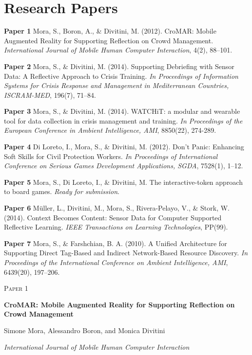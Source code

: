 \chapter{Research Papers}\label{papers}

\textbf{Paper 1} Mora, S., Boron, A., \& Divitini, M. (2012). CroMAR:
Mobile Augmented Reality for Supporting Reflection on Crowd Management.
\emph{International Journal of Mobile Human Computer Interaction}, 4(2),
88--101. 

\textbf{Paper 2} Mora, S., \& Divitini, M. (2014). Supporting Debriefing
with Sensor Data: A Reflective Approach to Crisis Training. \emph{In
Proceedings of Information Systems for Crisis Response and Management in
Mediterranean Countries, ISCRAM-MED}, 196(7), 71--84. 

\textbf{Paper 3} Mora, S., \& Divitini, M. (2014). WATCHiT: a modular
and wearable tool for data collection in crisis management and training.
\emph{In Proceedings of the European Conference in Ambient Intelligence,
AMI}, 8850(22), 274-289. 

\textbf{Paper 4} Di Loreto, I., Mora, S., \& Divitini, M. (2012). Don't
Panic: Enhancing Soft Skills for Civil Protection Workers. \emph{In
Proceedings of International Conference on Serious Games Development
Applications, SGDA}, 7528(1), 1--12. 

\textbf{Paper 5} Mora, S., Di Loreto, I., \& Divitini, M. The
interactive-token approach to board games. \emph{Ready for submission}.

\textbf{Paper 6} Müller, L., Divitini, M., Mora, S., Rivera-Pelayo, V.,
\& Stork, W. (2014). Context Becomes Content: Sensor Data for Computer
Supported Reflective Learning. \emph{IEEE Transactions on Learning
Technologies}, PP(99). 

\textbf{Paper 7} Mora, S., \& Farshchian, B. A. (2010). A Unified
Architecture for Supporting Direct Tag-Based and Indirect Network-Based
Resource Discovery. \emph{In Proceedings of the International Conference
on Ambient Intelligence, AMI}, 6439(20), 197--206. 

\cleardoublepage
\begin{flushright}
\textsc{\huge Paper 1}
\end{flushright}
\vspace{3cm}
\begin{center}
	\begin{framed}
		{\Large \textbf{CroMAR: Mobile Augmented Reality for Supporting Reflection on Crowd Management}}	
		\medskip
		
		Simone Mora, Alessandro Boron, and Monica Divitini
		
		\medskip		
		\emph{International Journal of Mobile Human Computer Interaction}
	\end{framed}	
\end{center}
\cleardoublepage


